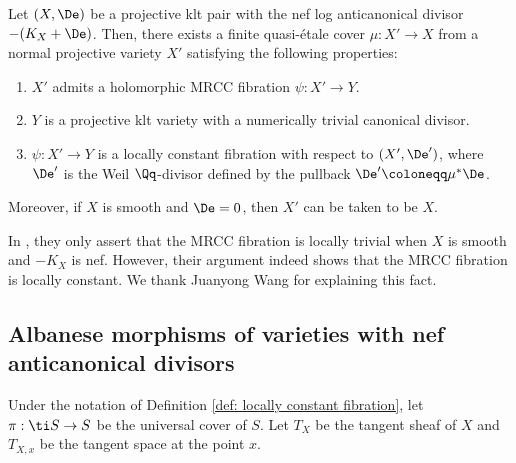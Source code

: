 \documentclass[11pt]{amsart}
\begin{document}
\begin{theorem}\label{thm: locally constant fibration of MRCC}
Let $(X, \De)$ be a projective klt pair with the nef log anticanonical divisor $-(K_X+\De)$. Then, there exists a finite quasi-\'etale cover $\mu: X' \to X$ from a normal projective variety $X'$ satisfying the following properties:
\begin{enumerate}
    \item $X'$ admits a holomorphic MRCC fibration $\psi: X' \to Y$.
    \item $Y$ is a projective klt variety with a numerically trivial canonical divisor.
    \item $\psi: X' \to Y$ is a locally constant fibration with respect to $(X',\De')$, where $\De'$ is the Weil $\Qq$-divisor defined by the pullback $\De' \coloneqq \mu^*\De$.
\end{enumerate}
Moreover, if $X$ is smooth and $\De=0$, then $X'$ can be taken to be $X$.
    \end{theorem}
    
    \begin{remark}\label{rmk: indeed locally constant}
    In \cite[Theorem 1.4]{CH19}, they only assert that the MRCC fibration is locally trivial when $X$ is smooth and $-K_X$ is nef. However, their argument indeed shows that the MRCC fibration is locally constant. We thank Juanyong Wang for explaining this fact.
    \end{remark}

    

\subsection{Albanese morphisms of varieties with nef anticanonical divisors}\label{subsec: Albanese}


Under the notation of Definition \ref{def: locally constant fibration}, let $\pi: \ti S \to S$ be the universal cover of $S$. Let $T_X$ be the tangent sheaf of $X$ and $T_{X,x}$ be the tangent space at the point $x$.
  
\end{document}
